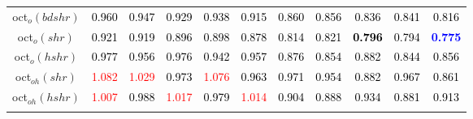 \begin{tabular}[t]{c|>{}cccc>{}c|ccccc}
oct$_o(bdshr)$ & \textcolor{black}{0.960} & \textcolor{black}{0.947} & \textcolor{black}{0.929} & \textcolor{black}{0.938} & \textcolor{black}{0.915} & \textcolor{black}{0.860} & \textcolor{black}{0.856} & \textcolor{black}{0.836} & \textcolor{black}{0.841} & \textcolor{black}{0.816}\\
oct$_o(shr)$ & \textcolor{black}{0.921} & \textcolor{black}{0.919} & \textcolor{black}{0.896} & \textcolor{black}{0.898} & \textcolor{black}{0.878} & \textcolor{black}{0.814} & \textcolor{black}{0.821} & \textcolor{black}{\textbf{0.796}} & \textcolor{black}{0.794} & \textcolor{blue}{\textbf{0.775}}\\
oct$_o(hshr)$ & \textcolor{black}{0.977} & \textcolor{black}{0.956} & \textcolor{black}{0.976} & \textcolor{black}{0.942} & \textcolor{black}{0.957} & \textcolor{black}{0.876} & \textcolor{black}{0.854} & \textcolor{black}{0.882} & \textcolor{black}{0.844} & \textcolor{black}{0.856}\\
oct$_{oh}(shr)$ & \textcolor{red}{1.082} & \textcolor{red}{1.029} & \textcolor{black}{0.973} & \textcolor{red}{1.076} & \textcolor{black}{0.963} & \textcolor{black}{0.971} & \textcolor{black}{0.954} & \textcolor{black}{0.882} & \textcolor{black}{0.967} & \textcolor{black}{0.861}\\
oct$_{oh}(hshr)$ & \textcolor{red}{1.007} & \textcolor{black}{0.988} & \textcolor{red}{1.017} & \textcolor{black}{0.979} & \textcolor{red}{1.014} & \textcolor{black}{0.904} & \textcolor{black}{0.888} & \textcolor{black}{0.934} & \textcolor{black}{0.881} & \textcolor{black}{0.913}\\
\bottomrule
{}\\
\end{tabular}
